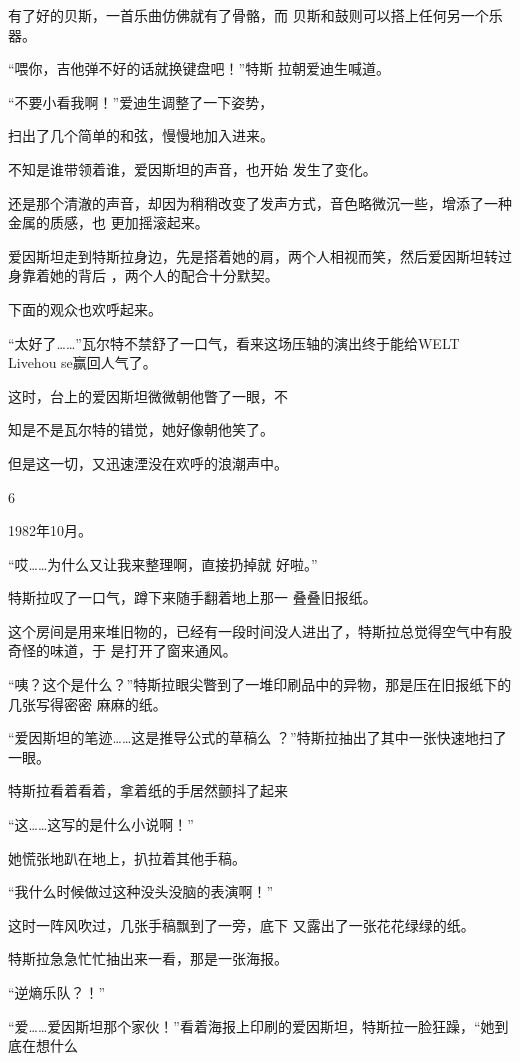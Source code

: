 \documentclass{article}
\begin{document}
有了好的贝斯，一首乐曲仿佛就有了骨骼，而
贝斯和鼓则可以搭上任何另一个乐器。 

“喂你，吉他弹不好的话就换键盘吧！”特斯
拉朝爱迪生喊道。 

“不要小看我啊！”爱迪生调整了一下姿势，
\newpage

扫出了几个简单的和弦，慢慢地加入进来。 

不知是谁带领着谁，爱因斯坦的声音，也开始
发生了变化。 

还是那个清澈的声音，却因为稍稍改变了发声方式，音色略微沉一些，增添了一种金属的质感，也
更加摇滚起来。 

爱因斯坦走到特斯拉身边，先是搭着她的肩，两个人相视而笑，然后爱因斯坦转过身靠着她的背后
，两个人的配合十分默契。 


下面的观众也欢呼起来。 

“太好了……”瓦尔特不禁舒了一口气，看来这场压轴的演出终于能给WELT Livehou
se赢回人气了。 

这时，台上的爱因斯坦微微朝他瞥了一眼，不

\newpage
知是不是瓦尔特的错觉，她好像朝他笑了。 

但是这一切，又迅速湮没在欢呼的浪潮声中。


6 


1982年10月。 

“哎……为什么又让我来整理啊，直接扔掉就
好啦。” 

特斯拉叹了一口气，蹲下来随手翻着地上那一
叠叠旧报纸。 

这个房间是用来堆旧物的，已经有一段时间没人进出了，特斯拉总觉得空气中有股奇怪的味道，于
是打开了窗来通风。 

“咦？这个是什么？”特斯拉眼尖瞥到了一堆印刷品中的异物，那是压在旧报纸下的几张写得密密
麻麻的纸。 

\newpage

“爱因斯坦的笔迹……这是推导公式的草稿么
？”特斯拉抽出了其中一张快速地扫了一眼。 

特斯拉看着看着，拿着纸的手居然颤抖了起来


“这……这写的是什么小说啊！” 


她慌张地趴在地上，扒拉着其他手稿。 

“我什么时候做过这种没头没脑的表演啊！”

这时一阵风吹过，几张手稿飘到了一旁，底下
又露出了一张花花绿绿的纸。 

特斯拉急急忙忙抽出来一看，那是一张海报。


“逆熵乐队？！” 

“爱……爱因斯坦那个家伙！”看着海报上印刷的爱因斯坦，特斯拉一脸狂躁，“她到底在想什么
\end{document}
